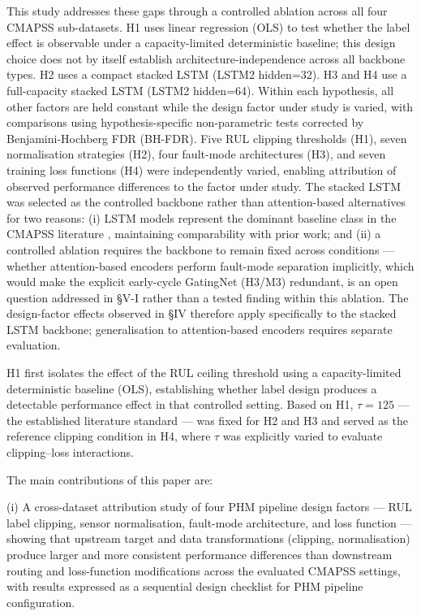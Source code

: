 \documentclass[preprint,10pt]{elsarticle}
\begin{document}
This study addresses these gaps through a controlled ablation across all four CMAPSS sub-datasets. H1 uses linear regression (OLS) to test whether the label effect is observable under a capacity-limited deterministic baseline; this design choice does not by itself establish architecture-independence across all backbone types. H2 uses a compact stacked LSTM (LSTM2 hidden=32). H3 and H4 use a full-capacity stacked LSTM (LSTM2 hidden=64). Within each hypothesis, all other factors are held constant while the design factor under study is varied, with comparisons using hypothesis-specific non-parametric tests corrected by Benjamini-Hochberg FDR (BH-FDR). Five RUL clipping thresholds (H1), seven normalisation strategies (H2), four fault-mode architectures (H3), and seven training loss functions (H4) were independently varied, enabling attribution of observed performance differences to the factor under study. The stacked LSTM was selected as the controlled backbone rather than attention-based alternatives for two reasons: (i) LSTM models represent the dominant baseline class in the CMAPSS literature \cite{ref05,ref06,ref09}, maintaining comparability with prior work; and (ii) a controlled ablation requires the backbone to remain fixed across conditions --- whether attention-based encoders perform fault-mode separation implicitly, which would make the explicit early-cycle GatingNet (H3/M3) redundant, is an open question addressed in \S{}V-I rather than a tested finding within this ablation. The design-factor effects observed in \S{}IV therefore apply specifically to the stacked LSTM backbone; generalisation to attention-based encoders requires separate evaluation.

H1 first isolates the effect of the RUL ceiling threshold using a capacity-limited deterministic baseline (OLS), establishing whether label design produces a detectable performance effect in that controlled setting. Based on H1, $\tau = 125$ --- the established literature standard \cite{ref05,ref06} --- was fixed for H2 and H3 and served as the reference clipping condition in H4, where $\tau$ was explicitly varied to evaluate clipping--loss interactions.

The main contributions of this paper are:

(i) A cross-dataset attribution study of four PHM pipeline design factors --- RUL label clipping, sensor normalisation, fault-mode architecture, and loss function --- showing that upstream target and data transformations (clipping, normalisation) produce larger and more consistent performance differences than downstream routing and loss-function modifications across the evaluated CMAPSS settings, with results expressed as a sequential design checklist for PHM pipeline configuration.
\end{document}
